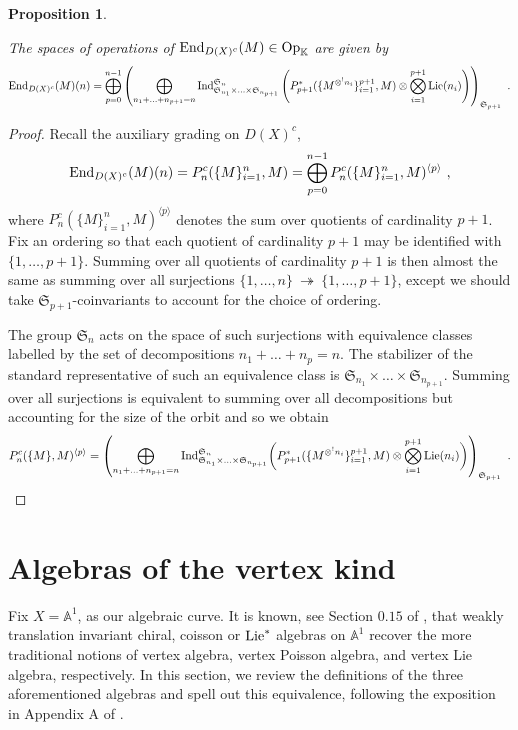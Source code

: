 \documentclass[11pt]{amsart}
\numberwithin{equation}{section}
\newtheorem{prop}[theo]{Proposition}
\theoremstyle{definition}
\newcommand{\bb}{\mathbb}
\newcommand{\mf}{\mathfrak}
\newcommand{\OEnd}{{\textup{End}}}
\newcommand{\K}{{\bb K}}
\newcommand{\onto}{{\ \twoheadrightarrow\ }}
\newcommand{\Ind}{{\textup{Ind}}}
\newcommand{\Lie}{{\textup{Lie}}}
\newcommand{\Op}{{\textup{Op}}}
\newcommand{\Ss}{{{\mf{S}}}}
\newcommand{\0}{{\textbf{0}}}
\newcommand{\DD}{{D}}
\def\IA{\mathbb{A}}
\def \mf{\mathfrak}
\def \Op{\mathrm{Op}}
\begin{document}
\begin{prop}\label{Oendcprop}

The spaces of operations of $\OEnd_{\DD(X)^c}(M)\in \Op_\K$ are given by
\[ 
\OEnd_{\DD(X)^c}(M)(n) = \bigoplus_{p=0}^{n-1}  \left( \bigoplus_{n_1+...+n_{p+1}=n} \Ind_{\Ss_{n_1}\times ... \times \Ss_{n_{p+1}}}^{\Ss_n}\left(P_{p+1}^*(\{ M^{\otimes^! n_i}\}_{i=1}^{p+1}  ,M)\otimes \bigotimes_{i=1}^{p+1} \Lie(n_i)\right) \right)_{\Ss_{p+1}} \ .  
\]
\end{prop}
\begin{proof}
Recall the auxiliary grading on $\DD(X)^c$,
\[ 
\OEnd_{\DD(X)^c}(M)(n) =P_n^c(\{ M\}_{i=1}^n,M)= \bigoplus_{p=0}^{n-1}P^c_n(\{M\}_{i=1}^n,M)^{\langle p\rangle} \ ,
\]
where $P^c_n(\{M\}^n_{i=1},M)^{\langle p\rangle}$ denotes the sum over quotients of cardinality $p+1$. Fix an ordering so that each quotient of cardinality $p+1$ may be identified with $\{1,\dots,p+1\}$. Summing over all quotients of cardinality $p+1$ is then almost the same as summing over all surjections $\{1,\dots,n\}\onto \{1,\dots,p+1\}$, except we should take $\Ss_{p+1}$-coinvariants to account for the choice of ordering.

The group $\Ss_n$ acts on the space of such surjections with equivalence classes labelled by the set of decompositions $n_1+\dots+n_p=n$. The stabilizer of the standard representative of such an equivalence class is $\Ss_{n_1}\times \dots \times \Ss_{n_{p+1}}$. Summing over all surjections is equivalent to summing over all decompositions but accounting for the size of the orbit and so we obtain
\[
P^c_n(\{M\},M)^{\langle p\rangle} = \left( \bigoplus_{n_1+...+n_{p+1}=n} \Ind_{\Ss_{n_1}\times ... \times \Ss_{n_{p+1}}}^{\Ss_n} \bigg( P_{p+1}^*(\{ M^{\otimes^! n_i}\}_{i=1}^{p+1}  ,M)\otimes \bigotimes_{i=1}^{p+1} \Lie(n_i)\bigg)  \right)_{\Ss_{p+1}} \ . 
\]

\end{proof}



\section{Algebras of the vertex kind}\label{sec:vertex algebras}

Fix $X=\IA^1$, as our algebraic curve. It is known, see Section $0.15$ of \cite{BD1}, that weakly translation invariant chiral, coisson or $\Lie^*$ algebras on $\IA^1$ recover the more traditional notions of vertex algebra, vertex Poisson algebra, and vertex Lie algebra, respectively. In this section, we review the definitions of the three  aforementioned algebras and spell out this equivalence, following the exposition in Appendix A of \cite{BDSHK19}.
\end{document}
